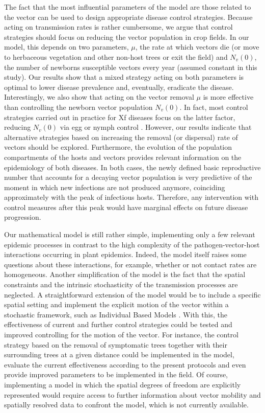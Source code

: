 The fact that the most influential parameters of the model are those
related to the vector can be used to design appropriate disease control
strategies. Because acting on transmission rates is rather cumbersome, we argue
that control strategies should focus on reducing the vector population in crop
fields. In our model, this depends on two parameters, $\mu$, the rate at which
vectors die (or move to herbaceous vegetation and other non-host trees or exit
the field) and $N_v(0)$, the number of newborns susceptible vectors every year
(assumed constant in this study). Our results show that a mixed strategy acting
on both parameters is optimal to lower disease prevalence and, eventually,
eradicate the disease. Interestingly, we also show that acting on the vector
removal $\mu$ is more effective than controlling the newborn vector population
$N_v(0)$. In fact, most control strategies carried out in practice for Xf
diseases focus on the latter factor, reducing $N_v(0)$ via egg or nymph control
\cite{Cornara2018, lopez2022mechanical, Lago2023}. However, our results
indicate that alternative strategies based on increasing the removal (or
dispersal) rate of vectors should be explored. Furthermore, the evolution of
the population compartments of the hosts and vectors provides relevant
information on the epidemiology of both diseases. In both cases, the newly
defined basic reproductive number that accounts for a decaying vector
population is very predictive of the moment in which new infections are not
produced anymore, coinciding approximately with the peak of infectious hosts.
Therefore, any intervention with control measures after this peak would have
marginal effects on future disease progression.

Our mathematical model is still rather simple, implementing only a few
relevant epidemic processes in contrast to the high complexity of the
pathogen-vector-host interactions occurring in plant epidemics. Indeed, the
model itself raises some questions about these interactions, for example,
whether or not contact rates are homogeneous. Another simplification of the
model is the fact that the spatial constraints and the intrinsic stochasticity
of the transmission processes are neglected. A straightforward extension of the
model would be to include a specific spatial setting and implement the explicit
motion of the vector within a stochastic framework, such as Individual Based
Models \cite{Grimm2005}. With this, the effectiveness of current and further
control strategies could be tested and improved controlling for the motion of
the vector. For instance, the control strategy based on the removal of
symptomatic trees together with their surrounding trees at a given distance
could be implemented in the model, evaluate the current effectiveness according
to the present protocols and even provide improved parameters to be implemented
in the field. Of course, implementing a model in which the spatial degrees of
freedom are explicitly represented would require access to further information
about vector mobility and spatially resolved data to confront the model, which
is not currently available.

